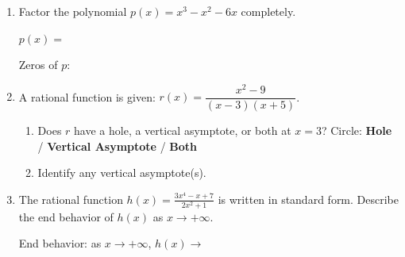 \documentclass[10pt]{article}
\begin{document}
\namedateperiod

\vspace{0.12in}

\begin{enumerate}[itemsep=14pt]

\item Factor the polynomial $p(x) = x^3 - x^2 - 6x$ completely.

      \vspace{0.08in}
      $p(x) = $ \blank{7cm}

      Zeros of $p$: \blank{5cm}

\item A rational function is given: $\displaystyle r(x) = \dfrac{x^2 - 9}{(x-3)(x+5)}$.

      \begin{enumerate}[label=(\alph*), itemsep=6pt]
        \item Does $r$ have a hole, a vertical asymptote, or both at $x = 3$?
              Circle: \quad \textbf{Hole} \quad / \quad \textbf{Vertical Asymptote} \quad / \quad \textbf{Both}

        \item Identify any vertical asymptote(s). \blank{4cm}
      \end{enumerate}

\item The rational function $\displaystyle h(x) = \frac{3x^4 - x + 7}{2x^2 + 1}$ is written in
      standard form. Describe the end behavior of $h(x)$ as $x \to +\infty$.

      \vspace{0.06in}
      End behavior: as $x \to +\infty$, $h(x) \to$ \blank{3cm}

\end{enumerate}
\end{document}
